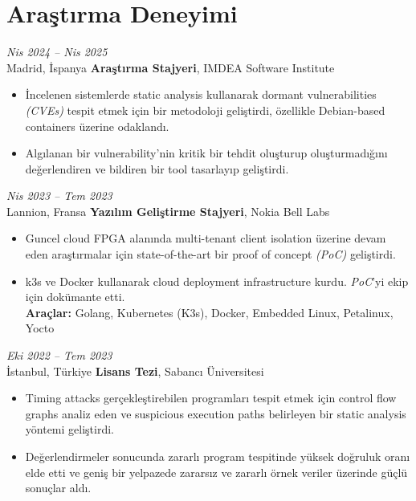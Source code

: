 \section{Araştırma Deneyimi}

\begin{twocolentry}{
    \textit{Nis 2024 – Nis 2025}\\
    \small Madrid, İspanya}
    \normalsize \textbf{Araştırma Stajyeri}, \small {IMDEA Software Institute}
    \small  
    \begin{itemize}
        \item İncelenen sistemlerde static analysis kullanarak dormant vulnerabilities \textit{(CVEs)} tespit etmek için bir metodoloji geliştirdi, özellikle Debian-based containers üzerine odaklandı.
        \item Algılanan bir vulnerability'nin kritik bir tehdit oluşturup oluşturmadığını değerlendiren ve bildiren bir tool tasarlayıp geliştirdi.
      \end{itemize}
\end{twocolentry}

\vspace{\betweenentryspace}
\begin{twocolentry}{
    \textit{Nis 2023 – Tem 2023}\\
    \small Lannion, Fransa}
    \normalsize \textbf{Yazılım Geliştirme Stajyeri}, \small {Nokia Bell Labs}
    \small  
    \begin{itemize}
        \item Guncel cloud FPGA alanında multi-tenant client isolation üzerine devam eden araştırmalar için state-of-the-art bir proof of concept \textit{(PoC)} geliştirdi.
        \item k3s ve Docker kullanarak cloud deployment infrastructure kurdu. \textit{PoC}'yi ekip için dokümante etti. \\
        \footnotesize \textbf{Araçlar:} Golang, Kubernetes (K3s), Docker, Embedded Linux, Petalinux, Yocto
    \end{itemize}
\end{twocolentry}

\vspace{\betweenentryspace}

\begin{twocolentry}{
    \textit{Eki 2022 – Tem 2023}\\
    \small İstanbul, Türkiye}
    \normalsize \textbf{Lisans Tezi}, \small {Sabancı Üniversitesi}
    \small  
    \begin{itemize}
        \item Timing attacks gerçekleştirebilen programları tespit etmek için control flow graphs analiz eden ve suspicious execution paths belirleyen bir static analysis yöntemi geliştirdi.
        \item Değerlendirmeler sonucunda zararlı program tespitinde yüksek doğruluk oranı elde etti ve geniş bir yelpazede zararsız ve zararlı örnek veriler üzerinde güçlü sonuçlar aldı.
    \end{itemize}
\end{twocolentry}


